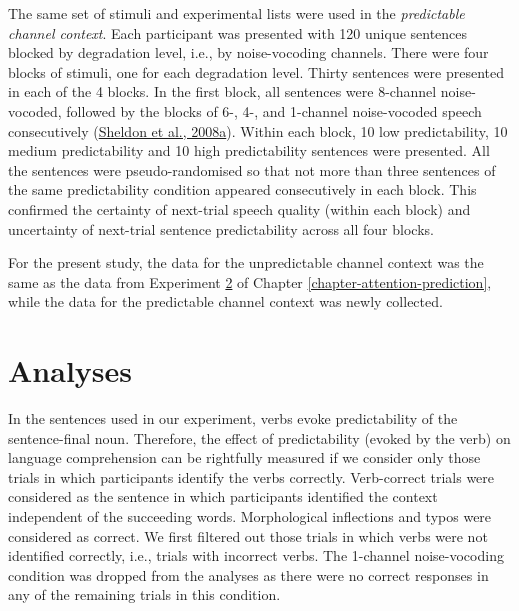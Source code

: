 \documentclass[a4paper, nobind]{templates/ociamthesis}
\begin{document}
The same set of stimuli and experimental lists were used in the \emph{predictable channel context}.
Each participant was presented with 120 unique sentences blocked by degradation level, i.e., by noise-vocoding channels.
There were four blocks of stimuli, one for each degradation level.
Thirty sentences were presented in each of the 4 blocks.
In the first block, all sentences were 8-channel noise-vocoded, followed by the blocks of 6-, 4-, and 1-channel noise-vocoded speech consecutively (\protect\hyperlink{ref-Sheldon2008a}{Sheldon et al., 2008a}).
Within each block, 10 low predictability, 10 medium predictability and 10 high predictability sentences were presented.
All the sentences were pseudo-randomised so that not more than three sentences of the same predictability condition appeared consecutively in each block.
This confirmed the certainty of next-trial speech quality (within each block) and uncertainty of next-trial sentence predictability across all four blocks.

For the present study, the data for the unpredictable channel context was the same as the data from Experiment \protect\hyperlink{experiment1a}{2} of Chapter \ref{chapter-attention-prediction}, while the data for the predictable channel context was newly collected.

\hypertarget{analyses-2}{%
\section{Analyses}\label{analyses-2}}

In the sentences used in our experiment, verbs evoke predictability of the sentence-final noun.
Therefore, the effect of predictability (evoked by the verb) on language comprehension can be rightfully measured if we consider only those trials in which participants identify the verbs correctly.
Verb-correct trials were considered as the sentence in which participants identified the context independent of the succeeding words.
Morphological inflections and typos were considered as correct.
We first filtered out those trials in which verbs were not identified correctly, i.e., trials with incorrect verbs.
The 1-channel noise-vocoding condition was dropped from the analyses as there were no correct responses in any of the remaining trials in this condition.
\end{document}
